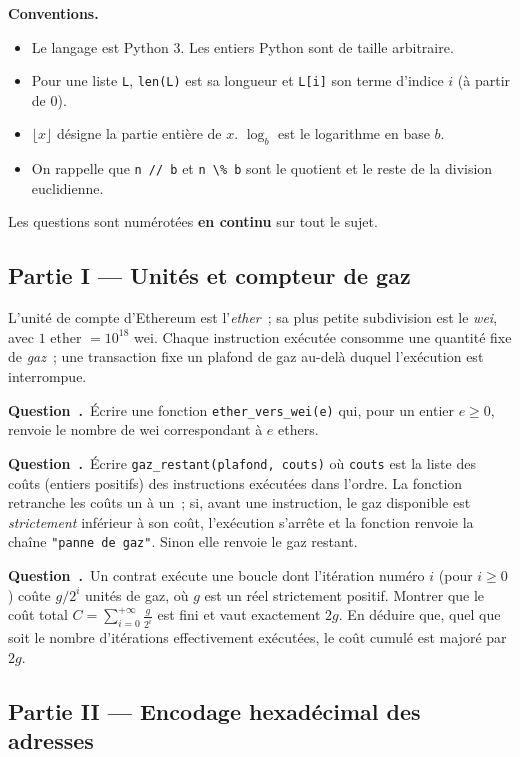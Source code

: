 \documentclass[11pt,a4paper]{article}
\newcounter{qcnt}
\newcommand{\Q}{\medskip\par\stepcounter{qcnt}\noindent\textbf{Question~\theqcnt.}~}
\newcommand{\code}[1]{\lstinline!#1!}
\begin{document}
\noindent\textbf{Conventions.}
\begin{itemize}[nosep]
  \item Le langage est Python 3. Les entiers Python sont de taille arbitraire.
  \item Pour une liste \code{L}, \code{len(L)} est sa longueur et \code{L[i]} son terme d'indice $i$ (à partir de $0$).
  \item $\lfloor x \rfloor$ désigne la partie entière de $x$. $\log_b$ est le logarithme en base $b$.
  \item On rappelle que \code{n // b} et \code{n \% b} sont le quotient et le reste de la division euclidienne.
\end{itemize}

\noindent Les questions sont numérotées \textbf{en continu} sur tout le sujet.

\medskip
\subsection*{Partie I --- Unités et compteur de gaz}

L'unité de compte d'Ethereum est l'\emph{ether}~; sa plus petite subdivision est le \emph{wei},
avec $1$ ether $= 10^{18}$ wei. Chaque instruction exécutée consomme une quantité fixe de
\emph{gaz}~; une transaction fixe un plafond de gaz au-delà duquel l'exécution est interrompue.

\Q Écrire une fonction \code{ether_vers_wei(e)} qui, pour un entier $e \ge 0$, renvoie le nombre
de wei correspondant à $e$ ethers.

\Q Écrire \code{gaz_restant(plafond, couts)} où \code{couts} est la liste des coûts (entiers
positifs) des instructions exécutées dans l'ordre. La fonction retranche les coûts un à un~; si,
avant une instruction, le gaz disponible est \emph{strictement} inférieur à son coût, l'exécution
s'arrête et la fonction renvoie la chaîne \code{"panne de gaz"}. Sinon elle renvoie le gaz restant.

\Q Un contrat exécute une boucle dont l'itération numéro $i$ (pour $i \ge 0$) coûte $g/2^{i}$
unités de gaz, où $g$ est un réel strictement positif. Montrer que le coût total
$\displaystyle C = \sum_{i=0}^{+\infty} \frac{g}{2^{i}}$ est fini et vaut exactement $2g$. En
déduire que, quel que soit le nombre d'itérations effectivement exécutées, le coût cumulé est
majoré par $2g$.

\subsection*{Partie II --- Encodage hexadécimal des adresses}
\end{document}
